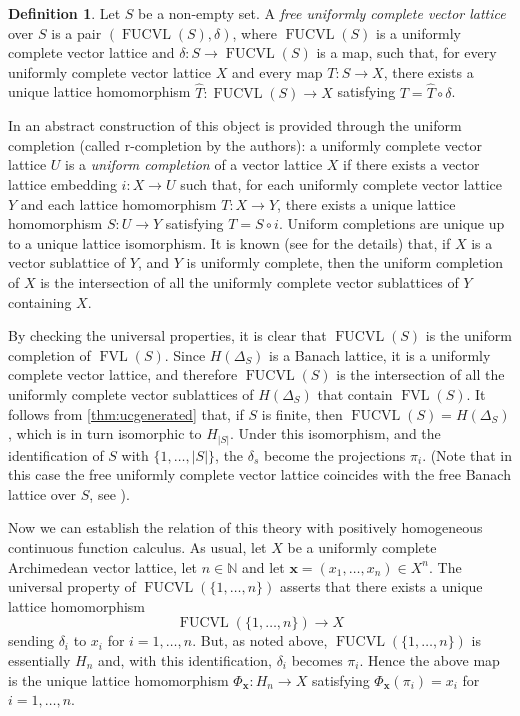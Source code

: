 \documentclass{amsart}
\theoremstyle{plain}
\theoremstyle{definition}
\newtheorem{defn}[thm]{Definition}
\theoremstyle{remark}
\newcommand\N{\ensuremath{\mathbb{N}}}
\newcommand{\FVL}[1]{\operatorname{FVL}(#1)}
\newcommand{\FUCVL}[1]{\operatorname{FUCVL}(#1)}
\newcommand{\Phx}{\Phi_{\bm x}}
\begin{document}
\begin{defn}
    Let $S$ be a non-empty set. A \emph{free uniformly complete vector
    lattice} over $S$ is a pair $(\FUCVL S, \delta)$, where $\FUCVL S$
    is a uniformly complete vector lattice and $\delta \colon S\to
    \FUCVL S$ is a map, such that, for every uniformly complete vector
    lattice $X$ and every map $T\colon S\to X$, there exists a unique
    lattice homomorphism $\hat{T}\colon \FUCVL S\to X$ satisfying
    $T=\hat{T}\circ \delta $.
\end{defn}

In \cite{emelyanov_gorokhova2024} an abstract construction of this
object is provided through the uniform completion (called
r-completion by the authors): a
uniformly complete vector lattice $U$ is a \emph{uniform completion} of a
vector lattice $X$ if there exists a vector lattice embedding $i\colon X\to
U$ such that, for each uniformly complete vector lattice $Y$ and each
lattice homomorphism $T\colon X\to Y$, there exists a unique lattice
homomorphism $S\colon U\to Y$ satisfying $T=S\circ i$. Uniform completions
are unique up to a unique lattice isomorphism. It is known (see
\cite{emelyanov_gorokhova2024} for the details) that, if $X$ is a
vector sublattice of $Y$, and $Y$ is uniformly complete, then the
uniform completion of $X$ is the intersection of all the uniformly
complete vector sublattices of $Y$ containing $X$.

By checking the universal properties, it is clear that $\FUCVL S$
is the uniform completion of $\FVL S$. Since $H(\Delta _S)$ is a
Banach lattice, it is a uniformly complete vector lattice, and
therefore $\FUCVL S$ is the intersection of all the uniformly complete
vector sublattices of $H(\Delta _S)$ that contain $\FVL S$. It follows
from \cref{thm:ucgenerated} that, if $S$ is finite, then $\FUCVL
S=H(\Delta _S)$, which is in turn isomorphic to $H_{|S|}$. Under this
isomorphism, and the identification of $S$ with $\{1,\ldots ,|S|\}$, the $\delta _s$ become the projections $\pi _i$.
(Note that in this case the free uniformly complete vector lattice
coincides with the free Banach lattice over $S$, see
\cite{de_pagter_wickstead2015,aviles_rodriguez_tradacete2018}).

Now we can establish the relation of this theory with positively
homogeneous continuous function calculus. As usual, let $X$ be a uniformly
complete Archimedean vector lattice, let $n \in \N$ and let $\bm
x=(x_1,\ldots ,x_n) \in X^{n}$. The universal property of
$\FUCVL{\{1,\ldots ,n\}}$ asserts that there exists a unique lattice
homomorphism
\[
\FUCVL{\{1,\ldots ,n\}}\to X
\]
sending $\delta _i$ to $x_i$ for $i=1,\ldots ,n$. But, as noted above,
$\FUCVL{\{1,\ldots ,n\}}$ is essentially $H_n$ and, with this
identification, $\delta _i$ becomes $\pi _i$. Hence the above map is
the unique lattice homomorphism $\Phx\colon H_n\to X$ satisfying
$\Phx(\pi _i)=x_i$ for $i=1,\ldots ,n$.
\end{document}
